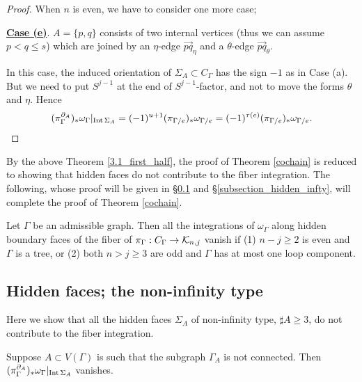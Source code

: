 \begin{proof}
When $n$ is even, we have to consider one more case;


\noindent
\underline{\bf Case (e)}.
$A=\{ p,q\}$ consists of two internal vertices (thus we can assume $p<q\le s$) which are joined by an $\eta$-edge
$\overrightarrow{pq}_{\eta}$ and a $\theta$-edge $\overrightarrow{pq}_{\theta}$.


In this case, the induced orientation of $\Sigma_A \subset C_{\Gamma}$ has the sign $-1$ as in Case (a).
But we need to put $S^{j-1}$ at the end of $S^{j-1}$-factor, and not to move the forms $\theta$ and $\eta$.
Hence
\[
 (\pi^{\partial_A}_{\Gamma})_* \omega_{\Gamma}|_{\mathrm{Int}\, \Sigma_A} = (-1)^{u+1}(\pi_{\Gamma / e})_* \omega_{\Gamma / e}
 = (-1)^{\tau (e)}(\pi_{\Gamma / e})_* \omega_{\Gamma / e}.
\]
\end{proof}



By the above Theorem \ref{3.1_first_half}, the proof of Theorem \ref{cochain} is reduced to showing that
hidden faces do not contribute to the fiber integration.
The following, whose proof will be given in \S \ref{subsection_hidden_first} and \S \ref{subsection_hidden_infty},
will complete the proof of Theorem \ref{cochain}.


\begin{thm}\label{3.1_second_half}
Let $\Gamma$ be an admissible graph.
Then all the integrations of $\omega_{\Gamma}$ along hidden boundary faces of the fiber of
$\pi_{\Gamma} : C_{\Gamma} \to \mathcal{K}_{n ,j}$ vanish if
(1) $n-j \ge 2$ is even and $\Gamma$ is a tree, or
(2) both $n>j\ge 3$ are odd and $\Gamma$ has at most one loop component.
\end{thm}





\subsection{Hidden faces; the non-infinity type}\label{subsection_hidden_first}


Here we show that all the hidden faces $\Sigma_A$ of non-infinity type, $\sharp A \ge 3$, do not contribute
to the fiber integration.


\begin{lem}\label{disconnected}
Suppose $A \subset V(\Gamma )$ is such that the subgraph $\Gamma_A$ is not connected.
Then $(\pi^{\partial_A}_{\Gamma})_* \omega_{\Gamma}|_{\mathrm{Int}\, \Sigma_A}$ vanishes.
\end{lem}


